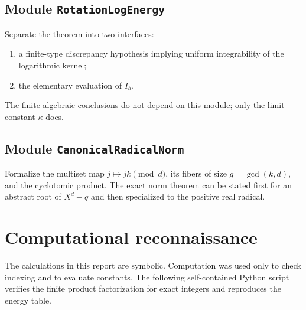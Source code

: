 \documentclass[11pt,oneside]{article}
\theoremstyle{definition}
\theoremstyle{remark}
\begin{document}
\subsection{Module \texttt{RotationLogEnergy}}

Separate the theorem into two interfaces:
\begin{enumerate}
\item a finite-type discrepancy hypothesis implying uniform integrability of the logarithmic
kernel;
\item the elementary evaluation of $I_b$.
\end{enumerate}
The finite algebraic conclusions do not depend on this module; only the limit constant
$\kappa$ does.

\subsection{Module \texttt{CanonicalRadicalNorm}}

Formalize the multiset map $j\mapsto jk\pmod d$, its fibers of size $g=\gcd(k,d)$, and the
cyclotomic product.  The exact norm theorem can be stated first for an abstract root of
$X^d-q$ and then specialized to the positive real radical.

\section{Computational reconnaissance}
\label{sec:computation}

The calculations in this report are symbolic.  Computation was used only to check indexing and
to evaluate constants.  The following self-contained Python script verifies the finite product
factorization for exact integers and reproduces the energy table.
\end{document}
